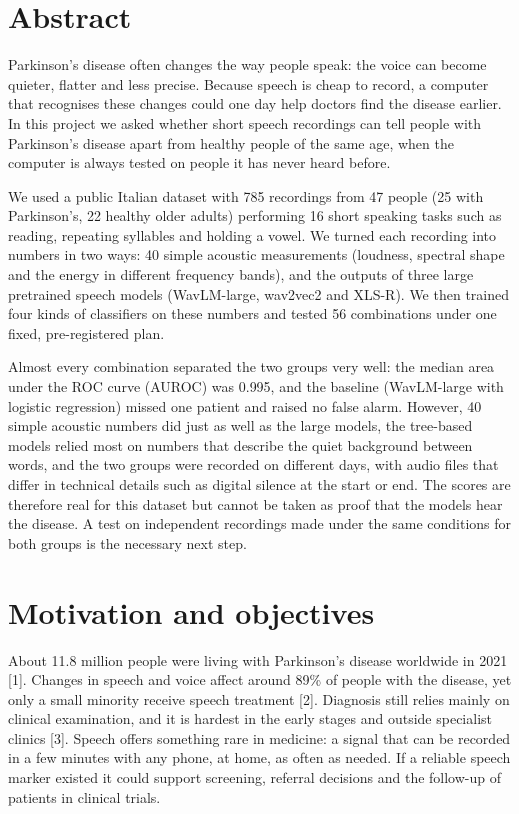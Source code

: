 \documentclass[11pt,a4paper]{article}
\begin{document}
\section{Abstract}\label{sec:abstract}
Parkinson's disease often changes the way people speak: the voice can become quieter, flatter and less precise. Because speech is cheap to record, a computer that recognises these changes could one day help doctors find the disease earlier. In this project we asked whether short speech recordings can tell people with Parkinson's disease apart from healthy people of the same age, when the computer is always tested on people it has never heard before.

We used a public Italian dataset with 785 recordings from 47 people (25 with Parkinson's, 22 healthy older adults) performing 16 short speaking tasks such as reading, repeating syllables and holding a vowel. We turned each recording into numbers in two ways: 40 simple acoustic measurements (loudness, spectral shape and the energy in different frequency bands), and the outputs of three large pretrained speech models (WavLM-large, wav2vec2 and XLS-R). We then trained four kinds of classifiers on these numbers and tested 56 combinations under one fixed, pre-registered plan.

Almost every combination separated the two groups very well: the median area under the ROC curve (AUROC) was 0.995, and the baseline (WavLM-large with logistic regression) missed one patient and raised no false alarm. However, 40 simple acoustic numbers did just as well as the large models, the tree-based models relied most on numbers that describe the quiet background between words, and the two groups were recorded on different days, with audio files that differ in technical details such as digital silence at the start or end. The scores are therefore real for this dataset but cannot be taken as proof that the models hear the disease. A test on independent recordings made under the same conditions for both groups is the necessary next step.

\section{Motivation and objectives}\label{sec:motivation}
About 11.8 million people were living with Parkinson's disease worldwide in 2021 [1]. Changes in speech and voice affect around 89\% of people with the disease, yet only a small minority receive speech treatment [2]. Diagnosis still relies mainly on clinical examination, and it is hardest in the early stages and outside specialist clinics [3]. Speech offers something rare in medicine: a signal that can be recorded in a few minutes with any phone, at home, as often as needed. If a reliable speech marker existed it could support screening, referral decisions and the follow-up of patients in clinical trials.
\end{document}
